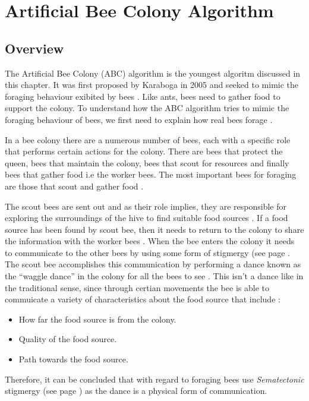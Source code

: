 \section{Artificial Bee Colony Algorithm}
\label{sec:BEE}
\subsection{Overview}
The Artificial Bee Colony (ABC) algorithm is the youngest algoritm discussed in this chapter. It was first proposed by Karaboga in 2005 and seeked to mimic the foraging behaviour exibited by bees \cite{ABCCompareStudy,ABCLeafConstrained,ABCNumericalOptimization}. Like ants, bees need to gather food to support the colony. To understand how the ABC algorithm tries to mimic the foraging behaviour of bees, we first need to explain how real bees forage \cite{ABCCompareStudy}. 

In a bee colony there are a numerous number of bees, each with a specific role that performs certain actions for the colony. There are bees that protect the queen, bees that maintain the colony, bees that scout for resources and finally bees that gather food i.e the worker bees. The most important bees for foraging are those that scout and gather food \cite{ABCCompareStudy}. 

The scout bees are sent out and as their role implies, they are responsible for exploring the surroundings of the hive to find suitable food sources \cite{ABCCompareStudy}. If a food source has been found by scout bee, then it needs to return to the colony to share the information with the worker bees \cite{ABCCompareStudy}. When the bee enters the colony it needs to communicate to the other bees by using some form of stigmergy (see page \pageref{def:stigmergy} \cite{ABCCompareStudy}. The scout bee accomplishes this communication by performing a dance known as the ``waggle dance'' in the colony for all the bees to see \cite{ABCCompareStudy}. This isn't a dance like in the traditional sense, since through certian movements the bee is able to commuicate a variety of characteristics about the food source that include \cite{ABCCompareStudy}:
\begin{itemize}
\item How far the food source is from the colony.
\item Quality of the food source.
\item Path towards the food source.
\end{itemize}

Therefore, it can be concluded that with regard to foraging bees use \emph{Sematectonic} stigmergy (see page \pageref{def:sematectonic}) as the dance is a physical form of communication.

